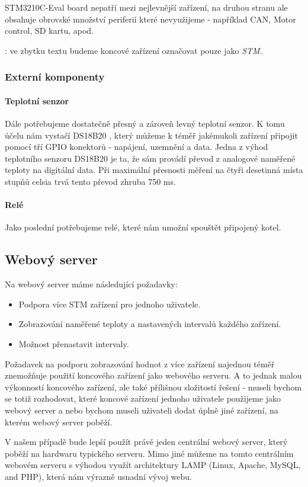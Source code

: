 STM3210C-Eval board nepatří mezi nejlevnější zařízení, na druhou stranu ale obsahuje obrovské
množství periferií které nevyužijeme - například CAN, Motor control, SD kartu, apod.

: ve zbytku textu budeme koncové zařízení označovat pouze jako \emph{STM}.

\subsubsection{Externí komponenty}
\paragraph{Teplotní senzor}
Dále potřebujeme dostatečně přesný a zároveň levný teplotní senzor.
K tomu účelu nám vystačí DS18B20 \cite{DS18B20}, který můžeme k téměř jakémukoli zařízení připojit pomocí tří
GPIO konektorů - napájení, uzemnění a data.
Jedna z výhod teplotního senzoru DS18B20 je ta, že sám provádí převod z analogové naměřené
teploty na digitální data.
Při maximální přesnosti měření na čtyři desetinná místa stupňů celsia trvá tento převod zhruba
750 ms.

\paragraph{Relé}
Jako poslední potřebujeme relé, které nám umožní spouštět připojený kotel.


\subsection{Webový server}
Na webový server máme následující požadavky:
\begin{itemize}
  \item Podpora více STM zařízení pro jednoho uživatele.
  \item Zobrazování naměřené teploty a nastavených intervalů každého zařízení.
  \item Možnost přenastavit intervaly.
\end{itemize}

Požadavek na podporu zobrazování hodnot z více zařízení najednou téměř znemožňuje použití koncového
zařízení jako webového serveru.
A to jednak malou výkonností koncového zařízení, ale také přílišnou složitostí řešení - museli bychom
se totiž rozhodovat, které koncové zařízení jednoho uživatele použijeme jako webový server a nebo bychom
museli uživateli dodat úplně jiné zařízení, na kterém webový server poběží.

V našem případě bude lepší použít právě jeden centrální webový server, který poběží na hardwaru typického
serveru.
Mimo jiné můžeme na tomto centrálním webovém serveru s výhodou využít architektury LAMP (Linux, Apache, MySQL, and PHP),
která nám výrazně usnadní vývoj webu.
